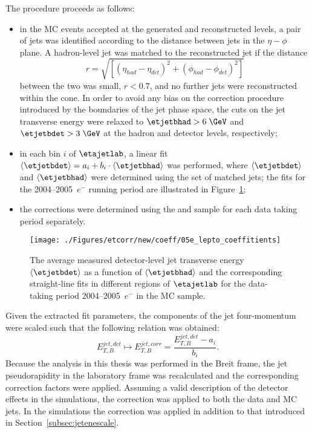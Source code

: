 The procedure proceeds as follows:
\begin{itemize}
 \item in the MC events accepted at the generated and reconstructed levels, a pair of jets was identified according to the distance between jets in the $\eta-\phi$ plane. A hadron-level jet was matched to the reconstructed jet if the distance 
\begin{equation}
r=\sqrt{\left[\left(\eta_{had}-\eta_{det}\right)^2 + \left(\phi_{had}-\phi_{det}\right)^2\right]}
\end{equation}
between the two was small, $r<0.7$, and no further jets were reconstructed within the cone. In order to avoid any bias on the correction procedure introduced by the boundaries of the jet phase space, the cuts on the jet transverse energy were relaxed to $\etjetbhad>6\;\GeV$ and $\etjetbdet>3\;\GeV$ at the hadron and detector levels, respectively;
 \item in each bin $i$ of $\etajetlab$, a linear fit $\left\langle\etjetbdet\right\rangle = a_i + b_i\cdot\left\langle\etjetbhad\right\rangle$ was performed, where $\left\langle\etjetbdet\right\rangle$ and $\left\langle\etjetbhad\right\rangle$ were determined using the set of matched jets; the fits for the 2004--2005~$e^-$ running period are illustrated in Figure~\ref{fig:05e_lepto_coeffitients};
 \item the corrections were determined using the \ariadne and \lepto sample for each data taking period separately. 
\end{itemize}
\begin{figure}[p]
\centering
\texttt{[image: ./Figures/etcorr/new/coeff/05e\_lepto\_coeffitients]}
\caption{The average measured detector-level jet transverse energy $\left\langle\etjetbdet\right\rangle$ as a function of $\left\langle\etjetbhad\right\rangle$ and the corresponding straight-line fits in different regions of $\etajetlab$ for the data-taking period 2004--2005~$e^-$ in the \lepto MC sample.}
\label{fig:05e_lepto_coeffitients}
\end{figure}

Given the extracted fit parameters, the components of the jet four-momentum were scaled such that the following relation was obtained:
 \begin{equation}
  E_{T,B}^{jet,det} \mapsto E_{T,B}^{jet,corr} = \frac{E_{T,B}^{jet,det} - a_i}{b_i}.
 \end{equation}
Because the analysis in this thesis was performed in the Breit frame, the jet pseudorapidity in the laboratory frame was recalculated and the corresponding correction factors were applied. Assuming a valid description of the detector effects in the simulations, the correction was applied to both the data and MC jets. In the simulations the correction was applied in addition to that introduced in Section~\ref{subsec:jetenescale}.

